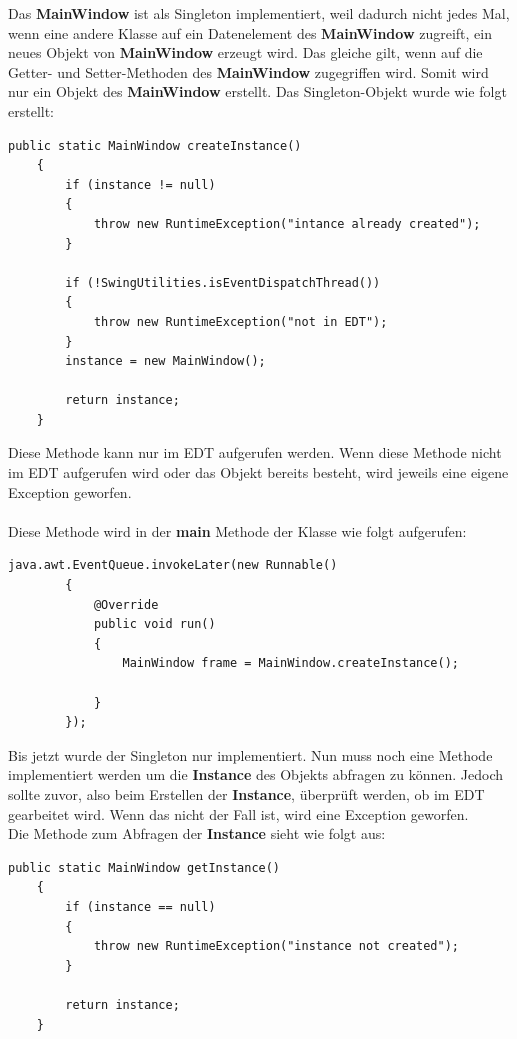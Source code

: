 Das \textbf{MainWindow} ist als Singleton implementiert, weil dadurch nicht jedes Mal, wenn eine andere Klasse auf ein Datenelement des \textbf{MainWindow} zugreift, ein neues Objekt von \textbf{MainWindow} erzeugt wird. Das gleiche gilt, wenn auf die Getter- und Setter-Methoden des \textbf{MainWindow} zugegriffen wird. Somit wird nur ein Objekt des \textbf{MainWindow} erstellt. Das Singleton-Objekt wurde wie folgt erstellt:
\begin{lstlisting}[style=JavaStyle, caption=MainWindow createInstance()]
public static MainWindow createInstance()
    {
        if (instance != null)
        {
            throw new RuntimeException("intance already created");
        }

        if (!SwingUtilities.isEventDispatchThread())
        {
            throw new RuntimeException("not in EDT");
        }
        instance = new MainWindow();

        return instance;
    }
\end{lstlisting}
Diese Methode kann nur im \ac{EDT} aufgerufen werden. Wenn diese Methode nicht im \ac{EDT} aufgerufen wird oder das Objekt bereits besteht, wird jeweils eine eigene Exception geworfen.
\\ \\ Diese Methode wird in der \textbf{main} Methode der Klasse wie folgt aufgerufen:
\begin{lstlisting}[style=JavaStyle, caption=MainWindow createInstance() Aufruf]
	java.awt.EventQueue.invokeLater(new Runnable()
        {
            @Override
            public void run()
            {
                MainWindow frame = MainWindow.createInstance();

            }
        });
\end{lstlisting}

\newpage

Bis jetzt wurde der Singleton nur implementiert. Nun muss noch eine Methode implementiert werden um die \textbf{Instance} des Objekts abfragen zu können. Jedoch sollte zuvor, also beim Erstellen der \textbf{Instance}, überprüft werden, ob im EDT gearbeitet wird. Wenn das nicht der Fall ist, wird eine Exception geworfen.
\\ Die Methode zum Abfragen der \textbf{Instance} sieht wie folgt aus:
\begin{lstlisting}[style=JavaStyle, caption=MainWindow.getInstance()]
public static MainWindow getInstance()
    {
        if (instance == null)
        {
            throw new RuntimeException("instance not created");
        }

        return instance;
    }
\end{lstlisting}

